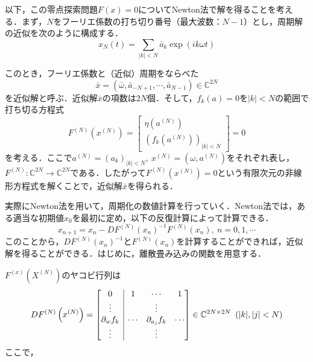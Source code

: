 \documentclass[11pt,a4paper]{jsarticle}
\theoremstyle{definition}
\begin{document}
以下，この零点探索問題$F(x)=0$についてNewton法で解を得ることを考える．まず，$N$をフーリエ係数の打ち切り番号（最大波数：$N-1$）とし，周期解の近似を次のように構成する．
\begin{equation*}
  x_N(t) = \sum_{|k|<N} \bar{a}_k \exp(ik\omega t)
\end{equation*}

このとき，フーリエ係数と（近似）周期をならべた
\begin{equation*}
  \bar{x} = \left(\bar{\omega},\bar{a}_{-N+1},\cdots,\bar{a}_{N-1}\right) \in \mathbb{C}^{2N}
\end{equation*}
を近似解と呼ぶ．近似解$\bar{x}$の項数は$2N$個．そして，$f_k(a)=0$を$|k|<N$の範囲で打ち切る方程式
\begin{equation*}
  F^{(N)}\left(x^{(N)}\right) = \begin{bmatrix}
    \eta\left(a^{(N)}\right) \\
    \left(f_k(a^{(N)})\right)_{|k|<N}
  \end{bmatrix}
  = 0
\end{equation*}
を考える．ここで$a^{(N)}=\left(a_k\right)_{|k|<N},\ x^{(N)}=\left(\omega, a^{(N)}\right)$をそれぞれ表し，$F^{(N)}:\mathbb{C}^{2N}\rightarrow\mathbb{C}^{2N}$である．したがって$F^{(N)}\left(x^{(N)}\right)=0$という有限次元の非線形方程式を解くことで，近似解$\bar{x}$を得られる．

実際にNewton法を用いて，周期化の数値計算を行っていく．Newton法では，ある適当な初期値$x_0$を最初に定め，以下の反復計算によって計算できる．
\begin{equation*}
  x_{n+1} = x_n - DF^{(N)}\left(x_n\right)^{-1} F^{(N)}\left(x_n\right),\ n=0,1,\cdots
\end{equation*}
このことから，$DF^{(N)}\left(x_n\right)^{-1}$と$F^{(N)}\left(x_n\right)$を計算することができれば，近似解を得ることができる．はじめに，離散畳み込みの関数を用意する．

$F^{(x)}(X^{(N)})$のヤコビ行列は
\begin{equation*}
  DF^{(N)}\left(x^{(N)}\right)=\begin{bmatrix}
    \multicolumn{1}{c|}{0}              & 1      & \cdots            & 1      \\
    \multicolumn{1}{c|}{\vdots}         &        & \vdots            &        \\
    \multicolumn{1}{c|}{\partial_w f_k} & \cdots & \partial_{a_j}f_k & \cdots \\
    \multicolumn{1}{c|}{\vdots}         &        & \vdots            &        \\
  \end{bmatrix} \in \mathbb{C}^{2N\times 2N}\ \left(|k|,|j|<N\right)
\end{equation*}
ここで，
\end{document}
